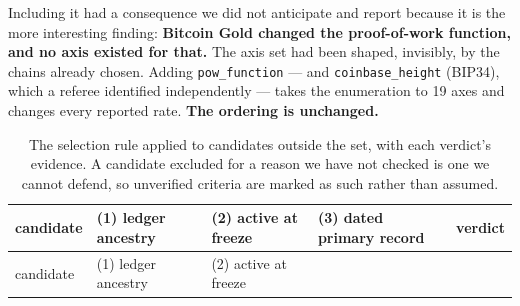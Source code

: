 \documentclass[
]{article}
\begin{document}
Including it had a consequence we did not anticipate and report because
it is the more interesting finding: \textbf{Bitcoin Gold changed the
proof-of-work function, and no axis existed for that.} The axis set had
been shaped, invisibly, by the chains already chosen. Adding
\texttt{pow\_function} --- and \texttt{coinbase\_height} (BIP34), which
a referee identified independently --- takes the enumeration to 19 axes
and changes every reported rate. \textbf{The ordering is unchanged.}

\begin{longtable}[]{@{}
  >{\raggedright\arraybackslash}p{}
  >{\raggedright\arraybackslash}p{}
  >{\raggedright\arraybackslash}p{}
  >{\raggedright\arraybackslash}p{}
  >{\raggedright\arraybackslash}p{}@{}}
\caption{The selection rule applied to candidates outside the set, with
each verdict's evidence. A candidate excluded for a reason we have not
checked is one we cannot defend, so unverified criteria are marked as
such rather than assumed.}\tabularnewline
\toprule\noalign{}
\begin{minipage}[b]{\linewidth}\raggedright
candidate
\end{minipage} & \begin{minipage}[b]{\linewidth}\raggedright
(1) ledger ancestry
\end{minipage} & \begin{minipage}[b]{\linewidth}\raggedright
(2) active at freeze
\end{minipage} & \begin{minipage}[b]{\linewidth}\raggedright
(3) dated primary record
\end{minipage} & \begin{minipage}[b]{\linewidth}\raggedright
verdict
\end{minipage} \\
\midrule\noalign{}
\endfirsthead
\toprule\noalign{}
\begin{minipage}[b]{\linewidth}\raggedright
candidate
\end{minipage} & \begin{minipage}[b]{\linewidth}\raggedright
(1) ledger ancestry
\end{minipage} & \begin{minipage}[b]{\linewidth}\raggedright
(2) active at freeze
\end{minipage} & \begin{minipage}[b]{\linewidth}\raggedright

\end{minipage}
\end{longtable}
\end{document}
